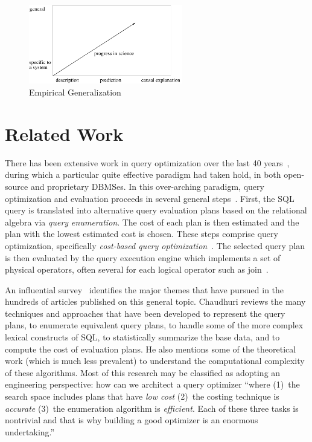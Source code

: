 \documentclass[prodmode,acmtods]{acmsmall}
\begin{document}
\begin{figure}[t]
\centering
\includegraphics[width=0.60\textwidth]{figures/understanding.pdf}%
\caption{Empirical Generalization\label{fig:empirical}}
\end{figure}

\section{Related Work}\label{sec:related}

There has been extensive work in query optimization over the last 40
years~\cite{Ioannidis96,Jarke84}, during which a particular quite effective
paradigm had taken hold, in both open-source and proprietary DBMSes. In this
over-arching paradigm, query optimization and evaluation
proceeds in several general steps~\cite{Ramakrishnan03}. First, the SQL query is 
translated into alternative query evaluation plans based on the 
relational algebra via {\em query enumeration}. The cost
of each plan is then estimated and the plan with the lowest estimated cost
is chosen. These steps comprise query optimization, specifically {\em
cost-based query optimization}~\cite{Selinger}. The selected query plan is
then evaluated by the query execution engine which implements a set of
physical operators, often several for each logical operator such as
join~\cite{Graefe93}.

An influential survey~\cite{Chaudhuri98} identifies
the major themes that have pursued in the hundreds of articles
published on this general topic. Chaudhuri reviews the many techniques and
approaches that have been developed to represent the query plans, to
enumerate equivalent query plans, to handle some of the more complex lexical
constructs of SQL, to statistically summarize the base data, and to compute the
cost of evaluation plans. He also mentions some of the theoretical work
(which is much less prevalent) to understand the computational complexity of
these algorithms. Most of this research may be classified as adopting an
engineering perspective: how can we architect a query optimizer ``where 
(1)~the search space includes plans that have {\em low cost} (2)~the costing
technique is {\em accurate} (3)~the enumeration algorithm is {\em
  efficient}. Each of these three tasks is nontrivial and that is why
building a good optimizer is an enormous undertaking.'' \cite[page~35]{Chaudhuri98}
\end{document}
